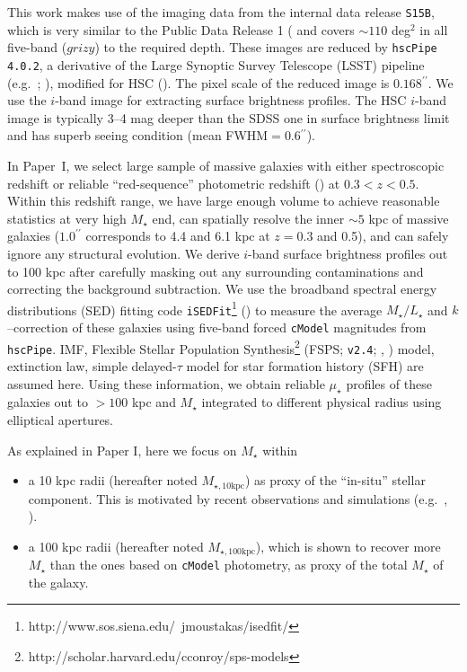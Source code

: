 \documentclass[a4paper,fleqn,usenatbib]{mnras}
\def\arcsec{{\prime\prime}}
\def\asec{$^{\prime\prime}$}
\def\cmodel{\texttt{cModel}}
\def\mstar{{$M_{\star}$}}
\def\minn{{$M_{\star,10\mathrm{kpc}}$}}
\def\mtot{{$M_{\star,100\mathrm{kpc}}$}}
\def\m2l{{$M_{\star}/L_{\star}$}}
\def\mden{{$\mu_{\star}$}}
\begin{document}
    This work makes use of the imaging data from the internal data release 
    \texttt{S15B}, which is very similar to the Public Data Release 1 
    (\citealt{HSC-DR1} and covers ${\sim} 110$ deg$^2$ in all five-band ($grizy$) to 
    the required depth. 
    These images are reduced by \texttt{hscPipe 4.0.2}, a derivative of the 
    Large Synoptic Survey Telescope (LSST) pipeline (e.g.\ \citealt{Juric2015}; 
    \citealt{Axelrod2010}), modified for HSC (\citealt{HSC-PIPE}).
    The pixel scale of the reduced image is $0.168$\asec{}.
    We use the $i$-band image for extracting surface brightness profiles.    
    The HSC $i$-band image is typically 3--4 mag deeper than the SDSS one in surface 
    brightness limit and has superb seeing condition (mean FWHM$=0.6$\asec{}).
    
    In Paper~I, we select large sample of massive galaxies with either spectroscopic 
    redshift or reliable ``red-sequence'' photometric redshift (\citealt{Rykoff2014}) 
    at $0.3<z<0.5$. 
    Within this redshift range, we have large enough volume to achieve reasonable 
    statistics at very high \mstar{} end, can spatially resolve the inner $\sim 5$ 
    kpc of massive galaxies ($1.0^{\arcsec}$ corresponds to 4.4 and 6.1 kpc at 
    $z=0.3$ and 0.5), and can safely ignore any structural evolution. 
    We derive $i$-band surface brightness profiles out to 100 kpc after carefully 
    masking out any surrounding contaminations and correcting the background 
    subtraction. 
    We use the broadband spectral energy distributions (SED) fitting code 
    \texttt{iSEDFit}\footnote{http://www.sos.siena.edu/~jmoustakas/isedfit/} 
    (\citealt{Moustakas13}) to measure the average \m2l{} and $k$--correction of 
    these galaxies using five-band forced \cmodel{} magnitudes from \texttt{hscPipe}.
    \citet{Chabrier2003} IMF, Flexible Stellar Population 
    Synthesis\footnote{http://scholar.harvard.edu/cconroy/sps-models}
    (FSPS; \texttt{v2.4}; \citealt{FSPS}, \citealt{Conroy2010}) model, 
    \citet{Calzetti2000} extinction law, simple delayed-$\tau$ model for star 
    formation history (SFH) are assumed here. 
    Using these information, we obtain reliable \mden{} profiles of these 
    galaxies out to $> 100$ kpc and \mstar{} integrated to different physical 
    radius using elliptical apertures. 
    
    As explained in Paper I, here we focus on \mstar{} within
        
    \begin{itemize}
    
        \item a 10 kpc radii (hereafter noted \minn{}) as proxy of the ``in-situ'' 
            stellar component. 
            This is motivated by recent observations and simulations 
            (e.g.~\citealt{vanDokkum2010}, \citealt{RodriguezGomez2016}).  
            
        \item a 100 kpc radii (hereafter noted \mtot{}), which is shown to recover 
            more \mstar{} than the ones based on \cmodel{} photometry, as proxy of the 
            total \mstar{} of the galaxy.
            
   \end{itemize}
   
\end{document}

